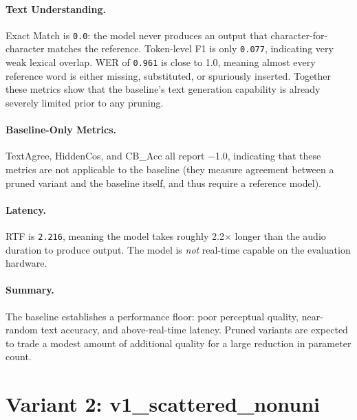 \documentclass[11pt,a4paper]{article}
\newcommand{\scoreval}[1]{\texttt{#1}}
\begin{document}
\paragraph{Text Understanding.}
Exact Match is \scoreval{0.0}: the model never produces an output that character-for-character matches the reference. Token-level F1 is only \scoreval{0.077}, indicating very weak lexical overlap. WER of \scoreval{0.961} is close to 1.0, meaning almost every reference word is either missing, substituted, or spuriously inserted. Together these metrics show that the baseline's text generation capability is already severely limited prior to any pruning.

\paragraph{Baseline-Only Metrics.}
TextAgree, HiddenCos, and CB\_Acc all report $-$1.0, indicating that these metrics are not applicable to the baseline (they measure agreement between a pruned variant and the baseline itself, and thus require a reference model).

\paragraph{Latency.}
RTF is \scoreval{2.216}, meaning the model takes roughly 2.2$\times$ longer than the audio duration to produce output. The model is \emph{not} real-time capable on the evaluation hardware.

\paragraph{Summary.}
The baseline establishes a performance floor: poor perceptual quality, near-random text accuracy, and above-real-time latency. Pruned variants are expected to trade a modest amount of additional quality for a large reduction in parameter count.

\newpage
\section{Variant 2: v1\_scattered\_nonuni}
\end{document}
